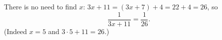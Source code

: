 There is no need to find $x$: $3x+11=(3x+7)+4=22+4=26$, so
\[
\dfrac{1}{3x+11}=\boxed{\dfrac{1}{26}}.
\]
(Indeed $x=5$ and $3\cdot5+11=26$.)
